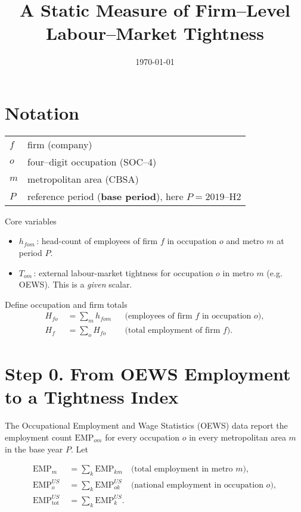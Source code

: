 \documentclass[11pt]{article}
\title{A Static Measure of Firm--Level Labour--Market Tightness}
\author{ }
\date{\today}
\begin{document}
\maketitle

\section{Notation}

\begin{tabular}{ll}
  $f$ & firm (company) \\
  $o$ & four--digit occupation (SOC--4) \\
  $m$ & metropolitan area (CBSA) \\
  $P$ & reference period (\textbf{base period}), here $P=\text{2019--H2}$ \\
\end{tabular}

\vspace{.5em}

\noindent Core variables
\begin{itemize}
  \item $h_{fom}$\,: head-count of employees of firm $f$ in occupation $o$ and metro $m$ at period $P$.
  \item $T_{om}$\,: external labour-market tightness for occupation $o$ in metro $m$ (e.g. OEWS).  This is a \emph{given} scalar.
\end{itemize}

Define occupation and firm totals
\begin{align}
  H_{fo} &\;= \sum_m h_{fom} && \text{(employees of firm $f$ in occupation $o$)} ,\\[2pt]
  H_f    &\;= \sum_o H_{fo}     && \text{(total employment of firm $f$)} .
\end{align}


\section{Step 0.\; From OEWS Employment to a Tightness Index}

The Occupational Employment and Wage Statistics (OEWS) data report the
employment count $\text{EMP}_{om}$ for every occupation $o$ in every
metropolitan area $m$ in the base year $P$.  Let

\begin{align*}
  \text{EMP}_{m}          &\;= \sum_k \text{EMP}_{km}       & \text{(total employment in metro $m$)},\\[2pt]
  \text{EMP}^{US}_{o}     &\;= \sum_k \text{EMP}_{ok}^{US}  & \text{(national employment in occupation $o$)},\\[2pt]
  \text{EMP}^{US}_{\text{tot}} &\;= \sum_k \text{EMP}_{k}^{US}. &
\end{align*}
\end{document}
